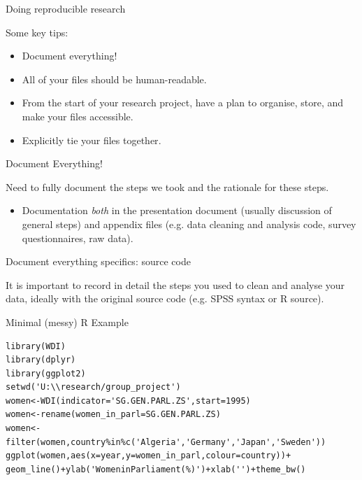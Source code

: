 \documentclass[10pt]{beamer}
\begin{document}
\begin{frame}{Doing reproducible research}

    {\large{Some key tips:}}

    \begin{itemize}

        \item \alert{Document everything!}

        \item All of your files should be \alert{human-readable}.

        \item \alert{From the start} of your research project, have a plan to \alert{organise}, store, and make your files accessible.

        \item Explicitly \alert{tie your files together}.
    \end{itemize}

\end{frame}


\begin{frame}{Document Everything!}

    Need to \alert{fully document} the steps we took and the rationale for these steps.

    \begin{itemize}
        \item Documentation \emph{both} in the presentation document (usually discussion of general steps) and appendix files (e.g. data cleaning and analysis code, survey questionnaires, raw data).
    \end{itemize}

\end{frame}

\begin{frame}{Document everything specifics: source code}

    It is important to record in detail the steps you used to clean and analyse your data, ideally with the original source code (e.g. SPSS syntax or R source).

\end{frame}

\begin{frame}[fragile]{Minimal (messy) R Example}

\begin{lstlisting}
library(WDI)
library(dplyr)
library(ggplot2)
setwd('U:\\research/group_project')
women<-WDI(indicator='SG.GEN.PARL.ZS',start=1995)
women<-rename(women_in_parl=SG.GEN.PARL.ZS)
women<-filter(women,country%in%c('Algeria','Germany','Japan','Sweden'))
ggplot(women,aes(x=year,y=women_in_parl,colour=country))+
geom_line()+ylab('WomeninParliament(%)')+xlab('')+theme_bw()
\end{lstlisting}

\end{frame}
\end{document}

